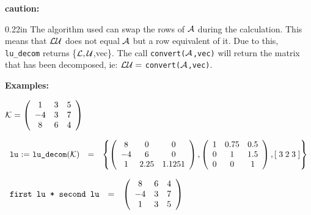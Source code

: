 {\bf caution:}

\begin{addtolength}{\leftskip}{0.22in}
The algorithm used can swap the rows of ${\cal A}$
                during the calculation. This means that ${\cal LU}$ does
                not equal ${\cal A}$ but a row equivalent of it. Due to
                this, {\tt lu\_decom} returns \{${\cal L,U}$,vec\}. The
                call {\tt convert(${\cal A}$,vec)} will return the
                matrix that has been decomposed, ie: ${\cal LU} = $
                {\tt convert(${\cal A}$,vec)}.

\end{addtolength}

{\bf Examples:}

\begin{flushleft}
\hspace*{0.175in}
\begin{math}
{\cal K} = \left( \begin{array}{ccc} 1 & 3 & 5 \\ -4 & 3 & 7 \\ 8 & 6 &
4
\end{array} \right)
\end{math}
\end{flushleft}

\begin{flushleft}
\hspace*{0.1in}
\begin{math}
\begin{array}{cccc}
${\tt lu} := {\tt lu\_decom}$({\cal K}) & = &
\left\{
        \left( \begin{array}{ccc} 8 & 0 & 0 \\ -4 & 6 & 0 \\ 1 & 2.25 &
1.125 1 \end{array} \right),
        \left( \begin{array}{ccc} 1 & 0.75 & 0.5 \\ 0 & 1 & 1.5 \\ 0 &
0 & 1 \end{array} \right),
        [\; 3 \; 2 \; 3 \; ]
\right\}
\end{array}
\end{math}
\end{flushleft}

\vspace*{0.1in}

\begin{flushleft}
\hspace*{0.1in}
\begin{math}
\begin{array}{ccc}
${\tt first lu * second lu}$ & = &
        \left( \begin{array}{ccc} 8 & 6 & 4 \\ -4 & 3 & 7 \\ 1 & 3 & 5
 \end{array} \right)
\end{array}
\end{math}
\end{flushleft}

